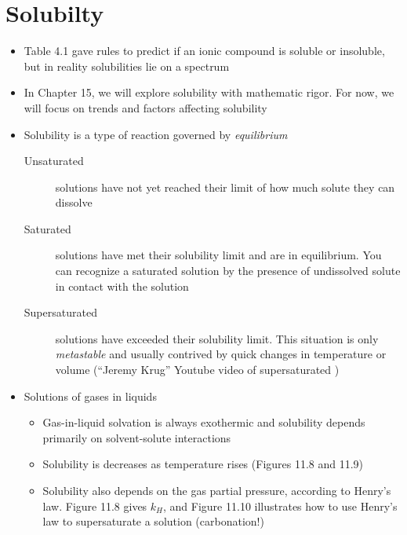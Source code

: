\documentclass[12pt, openany, letterpaper]{memoir}
\begin{document}
\section{Solubilty}
\begin{itemize}
  \item Table 4.1 gave rules to predict if an ionic compound is soluble or insoluble, but in reality solubilities lie on a spectrum
  \item In Chapter 15, we will explore solubility with mathematic rigor. For now, we will focus on trends and factors affecting solubility
  \item Solubility is a type of reaction governed by \emph{equilibrium}
  \begin{description}
    \item[Unsaturated] solutions have not yet reached their limit of how much solute they can dissolve
    \item[Saturated] solutions have met their solubility limit and are in equilibrium. You can recognize a saturated solution by the presence of undissolved solute in contact with the solution
    \item[Supersaturated] solutions have exceeded their solubility limit. This situation is only \emph{metastable} and usually contrived by quick changes in temperature or volume (``Jeremy Krug'' Youtube video of supersaturated )
  \end{description}
  \item Solutions of gases in liquids
  \begin{itemize}
    \item Gas-in-liquid solvation is always exothermic and solubility depends primarily on solvent-solute interactions
    \item Solubility is decreases as temperature rises (Figures 11.8 and 11.9)
    \item Solubility also depends on the gas partial pressure, according to Henry's law. Figure 11.8 gives $k_H$, and Figure 11.10 illustrates how to use Henry's law to supersaturate a solution (carbonation!)


\end{itemize}
\end{itemize}
\end{document}
